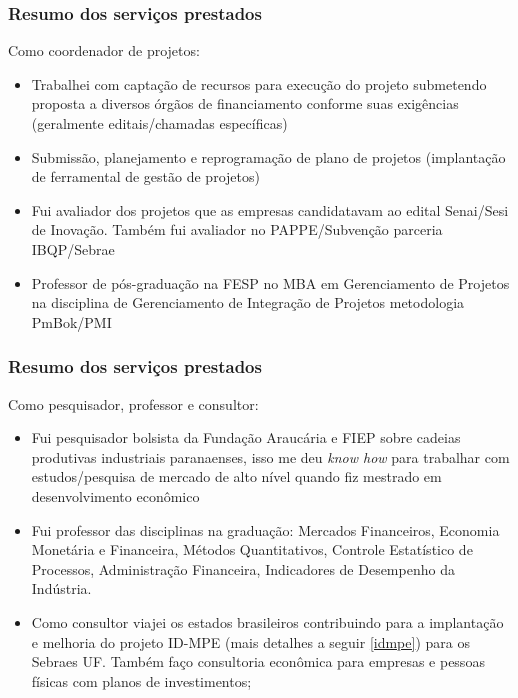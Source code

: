 \documentclass{beamer}
\begin{document}
\begin{frame}
\frametitle{Resumo dos serviços prestados}

\footnotesize
Como coordenador de projetos:
\begin{itemize}
\item Trabalhei com captação de recursos para execução do projeto submetendo proposta a diversos órgãos de financiamento conforme suas exigências (geralmente editais/chamadas específicas) 
\item Submissão, planejamento e reprogramação de plano de projetos (implantação de ferramental de gestão de projetos)
\item Fui avaliador dos projetos que as empresas candidatavam ao edital Senai/Sesi de Inovação. Também fui avaliador no PAPPE/Subvenção parceria IBQP/Sebrae
\item Professor de pós-graduação na FESP no MBA em Gerenciamento de Projetos na disciplina de Gerenciamento de Integração de Projetos metodologia PmBok/PMI
\end{itemize}

\end{frame}
\begin{frame}
\frametitle{Resumo dos serviços prestados}

\footnotesize
Como pesquisador, professor e consultor:

\begin{itemize}
    \item<1-3> Fui pesquisador bolsista da Fundação Araucária e FIEP sobre cadeias produtivas industriais paranaenses, isso me deu \textit{know how} para trabalhar com estudos/pesquisa de mercado de alto nível quando fiz mestrado em desenvolvimento econômico
    
    \item<2-3> Fui professor das disciplinas na graduação: Mercados Financeiros, Economia Monetária e Financeira, Métodos Quantitativos, Controle Estatístico de Processos, Administração Financeira, Indicadores de Desempenho da Indústria.  
    
    \item<3-3> Como consultor viajei os estados brasileiros contribuindo para a implantação e melhoria do projeto ID-MPE (mais detalhes a seguir \textcolor{blue}{\ref{idmpe}}) para os Sebraes UF. Também faço consultoria econômica para empresas e pessoas físicas com planos de investimentos;
\end{itemize}

\end{frame}
\end{document}
